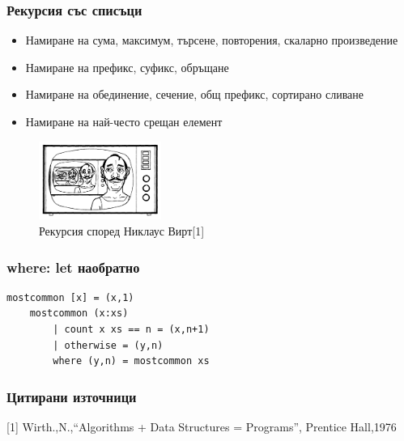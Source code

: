 \documentclass{beamer}
\begin{document}
\begin{frame}[fragile]
  \frametitle{Рекурсия със списъци}


  \begin{itemize}
    \item Намиране на сума, максимум, търсене, повторения, скаларно произведение
    \item Намиране на префикс, суфикс, обръщане
    \item Намиране на обединение, сечение, общ префикс, сортирано сливане
    \item Намиране на най-често срещан елемент
  \end{itemize}  

\begin{center}
  \begin{figure}
    \includegraphics[width=4.0cm]{images/rec_wirt}  
    \caption{Рекурсия според Никлаус Вирт[1]}
  \end{figure}
  
\end{center}
\end{frame}

\begin{frame}[fragile]
  \frametitle{where: let наобратно}
  \begin{lstlisting}[basicstyle=\small]
    mostcommon [x] = (x,1)
    mostcommon (x:xs) 
        | count x xs == n = (x,n+1)
        | otherwise = (y,n)
        where (y,n) = mostcommon xs    
  \end{lstlisting}
\end{frame}



\begin{frame}[fragile]
  \frametitle{Цитирани източници}

    [1] Wirth.,N.,``Algorithms + Data Structures = Programs'', Prentice Hall,1976
\end{frame}
\end{document}
